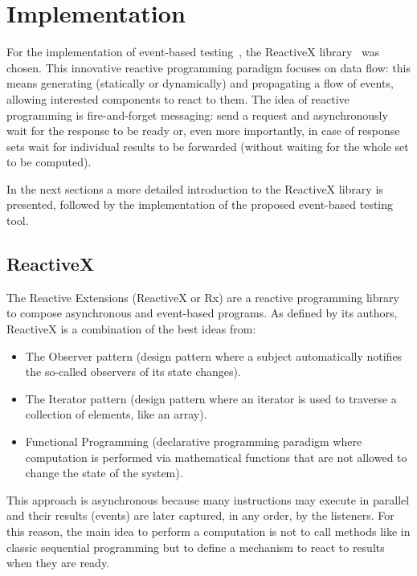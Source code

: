 \documentclass[11pt,a4paper,notitlepage]{article}
\begin{document}
\section{Implementation}

For the implementation of event-based testing~\cite{EventBasedTesting}, the ReactiveX library~\cite{ReactiveX} was chosen. This innovative reactive programming paradigm focuses on data flow: this means generating (statically or dynamically) and propagating a flow of events, allowing interested components to react to them. The idea of reactive programming is fire-and-forget messaging: send a request and asynchronously wait for the response to be ready or, even more importantly, in case of response sets wait for individual results to be forwarded (without waiting for the whole set to be computed).

In the next sections a more detailed introduction to the ReactiveX library is presented, followed by the implementation of the proposed event-based testing tool.

\subsection{ReactiveX}
The Reactive Extensions (ReactiveX or Rx) are a reactive programming library to compose asynchronous and event-based programs. As defined by its authors, ReactiveX is a combination of the best ideas from:
\begin{itemize}
	\item The Observer pattern (design pattern where a subject automatically notifies the so-called observers of its state changes).
	\item The Iterator pattern (design pattern where an iterator is used to traverse a collection of elements, like an array).
	\item Functional Programming (declarative programming paradigm where computation is performed via mathematical functions that are not allowed to change the state of the system).
\end{itemize}
This approach is asynchronous because many instructions may execute in parallel and their results (events) are later captured, in any order, by the listeners. For this reason, the main idea to perform a computation is not to call methods like in classic sequential programming but to define a mechanism to react to results when they are ready.
\end{document}
